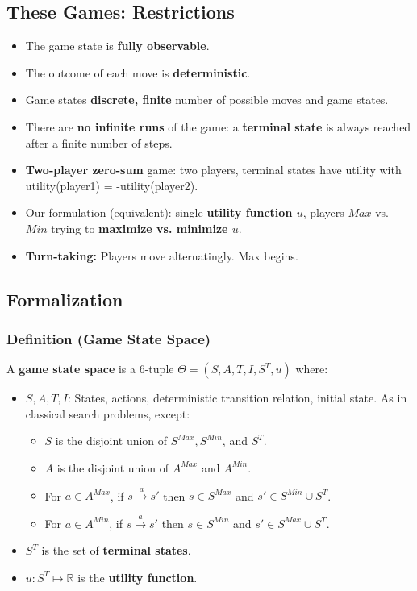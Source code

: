 \documentclass[conference, a4paper]{styles/acmsiggraph}
\begin{document}
    \subsection{These Games: Restrictions}
        \begin{itemize}
            \item The game state is \textbf{fully observable}.
            \item The outcome of each move is \textbf{deterministic}.
            \item Game states \textbf{discrete, finite} number of possible moves and game states.
            \item There are \textbf{no infinite runs} of the game: a \textbf{terminal state} is always reached after a finite number of steps.
            \item \textbf{Two-player zero-sum} game: two players, terminal states have utility with utility(player1) = -utility(player2).
            \item Our formulation (equivalent): single \textbf{utility function $u$}, players $Max$ vs. $Min$ trying to \textbf{maximize vs. minimize $u$}.
            \item \textbf{Turn-taking:} Players move alternatingly. Max begins.
        \end{itemize}
    
    \subsection{Formalization}
        \subsubsection{Definition (Game State Space)}
            A \textbf{game state space} is a 6-tuple $\Theta = (S,A,T,I,S^T,u)$ where:
                \begin{itemize}
                    \item $S,A,T,I$: States, actions, deterministic transition relation, initial state. 
                        As in classical search problems, except:
                            \begin{itemize}
                                \item $S$ is the disjoint union of $S^{Max},S^{Min}$, and $S^T$.
                                \item $A$ is the disjoint union of $A^{Max}$ and $A^{Min}$.
                                \item For $a \in A^{Max}$, if $s \xrightarrow{a} s'$ then $s \in S^{Max}$ and $s' \in S^{Min} \cup S^T$.
                                \item For $a \in A^{Min}$, if $s \xrightarrow{a} s'$ then $s \in S^{Min}$ and $s' \in S^{Max} \cup S^T$.
                            \end{itemize}
                        \item $S^T$ is the set of \textbf{terminal states}.
                        \item $u : S^T \mapsto \mathbb{R}$ is the \textbf{utility function}.
                \end{itemize}
        
\end{document}
